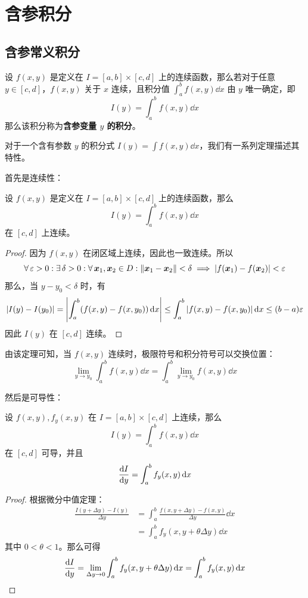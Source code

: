 \section{含参积分}

\subsection{含参常义积分}

\begin{definition}
	设 $f(x, y)$ 是定义在 $I = [a, b] \times [c, d]$ 上的连续函数，那么若对于任意 $y \in [c, d]$，$f(x, y)$ 关于 $x$ 连续，且积分值 $\int_{a}^{b} f(x, y) \dd{x}$ 由 $y$ 唯一确定，即
	$$
	I(y) = \int_{a}^{b} f(x, y) \dd{x}
	$$
	那么该积分称为\textbf{含参变量 $y$ 的积分}。
\end{definition}

对于一个含有参数 $y$ 的积分式 $I(y) = \int f(x, y) \dd{x}$，我们有一系列定理描述其特性。

首先是连续性：

\begin{theorem}
	设 $f(x, y)$ 是定义在 $I = [a, b] \times [c, d]$ 上的连续函数，那么
	$$
	I(y) = \int_{a}^{b} f(x, y) \dd{x}
	$$
	在 $[c, d]$ 上连续。

	\begin{proof}
		因为 $f(x, y)$ 在闭区域上连续，因此也一致连续。所以
		$$
		\forall\,\varepsilon > 0: \exists\,\delta > 0: \forall\,\boldsymbol{x}_1, \boldsymbol{x}_2 \in D: \norm{\boldsymbol{x}_1 - \boldsymbol{x}_2} < \delta \implies \abs{f(\boldsymbol{x}_1) - f(\boldsymbol{x}_2)} < \varepsilon
		$$
		那么，当 $y - y_0 < \delta$ 时，有
		$$
		\abs{I(y) - I(y_0)} = \abs{\int_{a}^{b} (f(x, y) - f(x, y_0)) \dd{x}} \le \int_{a}^{b} \abs{f(x, y) - f(x, y_0)} \dd{x} \le (b - a) \varepsilon
		$$
		因此 $I(y)$ 在 $[c, d]$ 连续。
	\end{proof}
\end{theorem}

由该定理可知，当 $f(x, y)$ 连续时，极限符号和积分符号可以交换位置：
$$
\lim_{y \to y_0} \int_{a}^{b} f(x, y) \dd{x} = \int_{a}^{b} \lim_{y \to y_0} f(x, y) \dd{x}
$$

然后是可导性：

\begin{theorem}
	设 $f(x, y), f_y(x, y)$ 在 $I = [a, b] \times [c, d]$ 上连续，那么
	$$
	I(y) = \int_a^b f(x, y) \dd{x}
	$$
	在 $[c, d]$ 可导，并且
	$$
	\dv{I}{y} = \int_{a}^{b} f_y(x, y) \dd{x}
	$$
	\begin{proof}
		根据微分中值定理：
		$$
		\begin{aligned}
			\frac{I(y + \Delta y) - I(y)}{\Delta y} & = \int_{a}^{b} \frac{f(x, y + \Delta y) - f(x, y)}{\Delta y} \dd{x} \\
			& = \int_{a}^{b} f_y(x, y + \theta \Delta y) \dd{x}
		\end{aligned}
		$$
		其中 $0 < \theta < 1$。那么可得
		$$
		\dv{I}{y} = \lim_{\Delta y \to 0} \int_{a}^{b} f_y(x, y + \theta \Delta y) \dd{x} = \int_{a}^{b} f_y(x, y) \dd{x}
		$$
	\end{proof}
\end{theorem}

